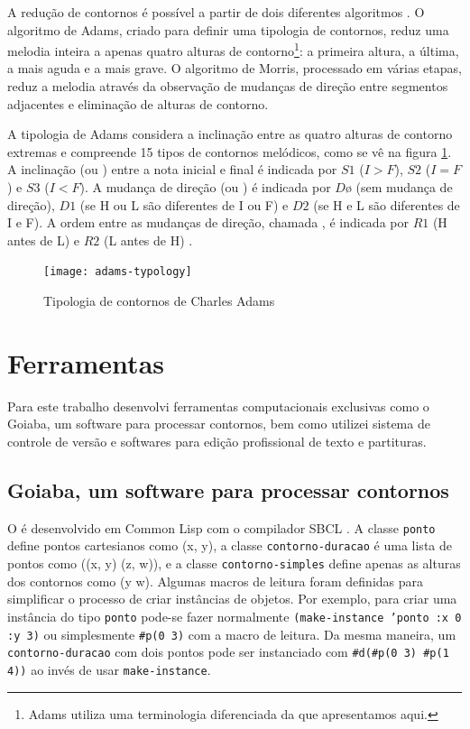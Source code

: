 A redução de contornos é possível a partir de dois diferentes
algoritmos \cite{adams76:melodic,morris93:directions}. O algoritmo de
Adams, criado para definir uma tipologia de contornos, reduz uma
melodia inteira a apenas quatro alturas de contorno\footnote{Adams
  utiliza uma terminologia diferenciada da que apresentamos aqui.}: a
primeira altura, a última, a mais aguda e a mais grave. O algoritmo de
Morris, processado em várias etapas, reduz a melodia através da
observação de mudanças de direção entre segmentos adjacentes e
eliminação de alturas de contorno.

A tipologia de Adams considera a inclinação entre as quatro alturas de
contorno extremas e compreende 15 tipos de contornos melódicos, como
se vê na figura \ref{fig:adams-typology}. A inclinação (ou
) entre a nota inicial e final é indicada por $S1$ ($I >
F$), $S2$ ($I = F$) e $S3$ ($I < F$). A mudança de direção (ou
) é indicada por $Dø$ (sem mudança de direção), $D1$
(se H ou L são diferentes de I ou F) e $D2$ (se H e L são diferentes
de I e F). A ordem entre as mudanças de direção, chamada
, é indicada por $R1$ (H antes de L) e $R2$ (L antes
de H) \cite{adams76:melodic}.

\begin{figure}
  \centering
  \texttt{[image: adams-typology]}
  \caption{Tipologia de contornos de Charles Adams}
  \label{fig:adams-typology}
\end{figure}

\chapter{Ferramentas}
\label{cha:ferramentas}

Para este trabalho desenvolvi ferramentas computacionais exclusivas
como o Goiaba, um software para processar contornos, bem como utilizei
sistema de controle de versão e softwares para edição profissional de
texto e partituras.

\section{Goiaba, um software para processar contornos}
\label{sec:goiaba-software-para}

O \goiaba{} é desenvolvido em Common Lisp com o compilador SBCL
\cite{team07:sbcl}.
A classe \texttt{ponto} define pontos cartesianos como (x, y), a
classe \texttt{contorno-duracao} é uma lista de pontos como ((x, y)
(z, w)), e a classe \texttt{contorno-simples} define apenas as alturas
dos contornos como (y w). Algumas macros de leitura foram definidas
para simplificar o processo de criar instâncias de objetos. Por
exemplo, para criar uma instância do tipo \texttt{ponto} pode-se fazer
normalmente \texttt{(make-instance 'ponto :x 0 :y 3)} ou simplesmente
\verb!#p(0 3)! com a macro de leitura. Da mesma maneira, um
\texttt{contorno-duracao} com dois pontos pode ser instanciado com
\verb!#d(#p(0 3) #p(1 4))! ao invés de usar \texttt{make-instance}.

